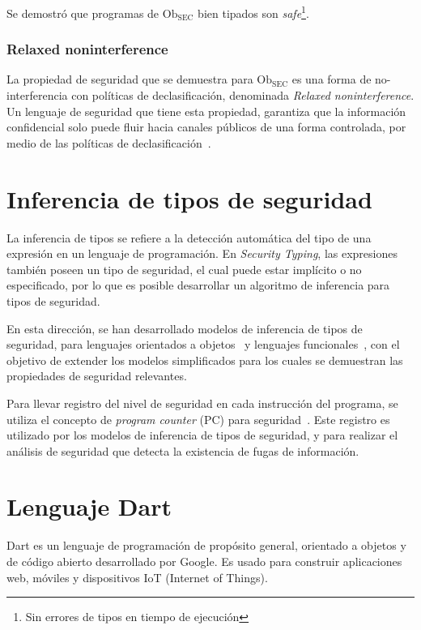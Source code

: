 	Se demostró que programas de $\text{Ob}_{\text{SEC}}$ bien tipados son \textit{safe}\footnote{Sin errores de tipos en tiempo de ejecución}.

	\subsubsection{Relaxed noninterference}

	La propiedad de seguridad que se demuestra para $\text{Ob}_{\text{SEC}}$ es una forma de no-interferencia con políticas de declasificación, denominada \textit{Relaxed noninterference}.	Un lenguaje de seguridad que tiene esta propiedad, garantiza que la información confidencial solo puede fluir hacia canales públicos de una forma controlada, por medio de las políticas de declasificación~\cite{cruzAl:ecoop2017}.

	\section{Inferencia de tipos de seguridad}

	La inferencia de tipos se refiere a la detección automática del tipo de una expresión en un lenguaje de programación. En \textit{Security Typing}, las expresiones también poseen un tipo de seguridad, el cual puede estar implícito o no especificado, por lo que es posible desarrollar un algoritmo de inferencia para tipos de seguridad.

	En esta dirección, se han desarrollado modelos de inferencia de tipos de seguridad, para lenguajes orientados a objetos~\cite{SunBanerjeeGiacobazzi} y lenguajes funcionales~\cite{Pottier}, con el objetivo de extender los modelos simplificados para los cuales se demuestran las propiedades de seguridad relevantes.

	Para llevar registro del nivel de seguridad en cada instrucción del programa, se utiliza el concepto de \textit{program counter} (PC) para seguridad~\cite{Molnar:2005}. Este registro es utilizado por los modelos de inferencia de tipos de seguridad, y para realizar el análisis de seguridad que detecta la existencia de fugas de información.

	\section{Lenguaje Dart}

	Dart es un lenguaje de programación de propósito general, orientado a objetos y de código abierto desarrollado por Google. Es usado para construir aplicaciones web, móviles y dispositivos IoT (Internet of Things). %

